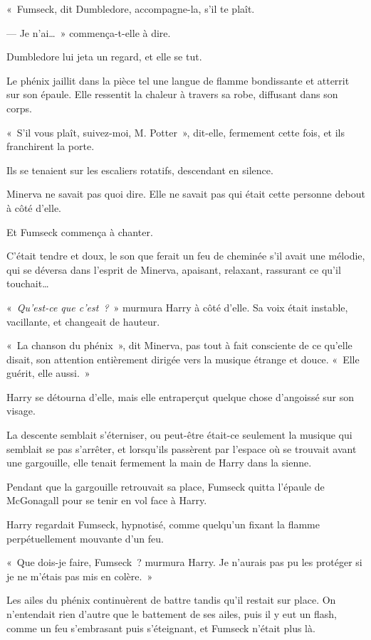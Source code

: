 «~Fumseck, dit Dumbledore, accompagne-la, s'il te plaît.

--- Je n'ai…~»
commença-t-elle à dire.

Dumbledore lui jeta un regard, et elle se tut.

Le phénix jaillit dans la pièce tel une langue de flamme bondissante et atterrit sur son épaule.
Elle ressentit la chaleur à travers sa robe, diffusant dans son corps.

«~S'il vous plaît, suivez-moi, M. Potter~», dit-elle, fermement cette fois, et ils franchirent la porte.

\later

Ils se tenaient sur les escaliers rotatifs, descendant en silence.

Minerva ne savait pas quoi dire.
Elle ne savait pas qui était cette personne debout à côté d'elle.

Et Fumseck commença à chanter.

C'était tendre et doux, le son que ferait un feu de cheminée s'il avait une mélodie, qui se déversa dans l'esprit de Minerva, apaisant, relaxant, rassurant ce qu'il touchait…

«~\emph{Qu'est-ce que c'est~?}~»
murmura Harry à côté d'elle.
Sa voix était instable, vacillante, et changeait de hauteur.

«~La chanson du phénix~», dit Minerva, pas tout à fait consciente de ce qu'elle disait, son attention entièrement dirigée vers la musique étrange et douce.
«~Elle guérit, elle aussi.~»

Harry se détourna d'elle, mais elle entraperçut quelque chose d'angoissé sur son visage.

La descente semblait s'éterniser, ou peut-être était-ce seulement la musique qui semblait se pas s'arrêter, et lorsqu'ils passèrent par l'espace où se trouvait avant une gargouille, elle tenait fermement la main de Harry dans la sienne.

Pendant que la gargouille retrouvait sa place, Fumseck quitta l'épaule de McGonagall pour se tenir en vol face à Harry.

Harry regardait Fumseck, hypnotisé, comme quelqu'un fixant la flamme perpétuellement mouvante d'un feu.

«~Que dois-je faire, Fumseck~? murmura Harry.
Je n'aurais pas pu les protéger si je ne m'étais pas mis en colère.~»

Les ailes du phénix continuèrent de battre tandis qu'il restait sur place.
On n'entendait rien d'autre que le battement de ses ailes, puis il y eut un flash, comme un feu s'embrasant puis s'éteignant, et Fumseck n'était plus là.

